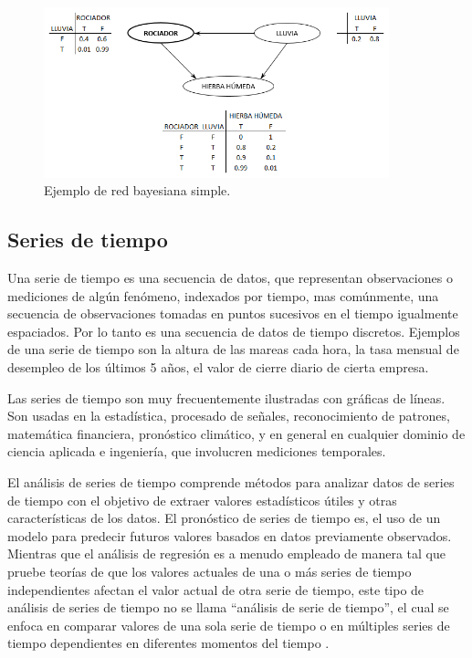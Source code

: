\begin{figure}[h!]
	\centering
	\includegraphics[width=10cm]{img/redBayesianaEjemplo.png}
	\caption{Ejemplo de red bayesiana simple.}
	\label{fig:redBayesianaEjemplo}
\end{figure}

\subsection{Series de tiempo}
Una serie de tiempo es una secuencia de datos, que representan observaciones o mediciones de algún fenómeno, indexados por tiempo, mas comúnmente, una secuencia de observaciones tomadas en puntos sucesivos en el tiempo igualmente espaciados. Por lo tanto es una secuencia de datos de tiempo discretos. 
Ejemplos de una serie de tiempo son la altura de las mareas cada hora, la tasa mensual de desempleo de los últimos 5 años, el valor de cierre diario de cierta empresa.

Las series de tiempo son muy frecuentemente ilustradas con gráficas de líneas. 
Son usadas en la estadística, procesado de señales, reconocimiento de patrones, matemática financiera, pronóstico climático, y en general en cualquier dominio de ciencia aplicada e ingeniería, que involucren mediciones temporales.

El análisis de series de tiempo comprende métodos para analizar datos de series de tiempo con el objetivo de extraer valores estadísticos útiles y otras características de los datos. 
El pronóstico de series de tiempo es, el uso de un modelo para predecir futuros valores basados en datos previamente observados. 
Mientras que el análisis de regresión es a menudo empleado de manera tal que pruebe teorías de que los valores actuales de una o más series de tiempo independientes afectan el valor actual de otra serie de tiempo, este tipo de análisis de series de tiempo no se llama
``análisis de serie de tiempo'', el cual se enfoca en comparar valores de una sola serie de tiempo o en múltiples series de tiempo dependientes en diferentes momentos del tiempo \cite{MImdadullahTimeSeriesAnalysis}.

